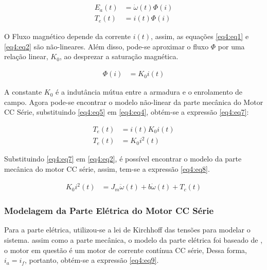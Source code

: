 \begin{align}
	E_a(t) &= \dot{\omega}(t) \Phi{(i)} \label{eq4:eq3}\\
	T_e(t) &= i(t) \Phi{(i)}			\label{eq4:eq4}
\end{align}

O Fluxo magnético depende da corrente $i(t)$, assim, as equações \ref{eq4:eq1} e \ref{eq4:eq2} são não-lineares. Além disso, pode-se aproximar o fluxo $\Phi$ por uma relação linear, $K_0$, ao desprezar a saturação magnética.

\begin{align}
	\Phi(i) &= K_0 i(t) \label{eq4:eq5}
\end{align}

A constante $K_0$ é a indutância mútua entre a armadura e o enrolamento de campo. Agora pode-se encontrar o modelo não-linear da parte mecânica do Motor CC Série, substituindo \ref{eq4:eq5} em \ref{eq4:eq4}, obtém-se a expressão \ref{eq4:eq7}:

\begin{align}
	T_e(t) &= i(t) K_0 i(t) \label{eq4:eq6}\\
	T_e(t) &= K_0 i^2(t) 	\label{eq4:eq7}
\end{align}

Substituindo \ref{eq4:eq7} em \ref{eq4:eq2}, é possível encontrar o modelo da parte mecânica do motor CC série, assim, tem-se a expressão  \ref{eq4:eq8}.


\begin{align}
	K_0 i^2(t) &= J_m\ddot{\omega}(t) + b\dot{\omega}(t) + T_c(t) \label{eq4:eq8}
\end{align}



\subsubsection{Modelagem da Parte Elétrica do Motor CC Série}

Para a parte elétrica, utilizou-se a lei de Kirchhoff das tensões para modelar o sistema. assim como a parte mecânica, o modelo da parte elétrica foi baseado de \cite{jesus}, o motor em questão é um motor de corrente contínua CC série, Dessa forma, $i_a = i_f$, portanto, obtém-se a expressão \ref{eq4:eq9}.



